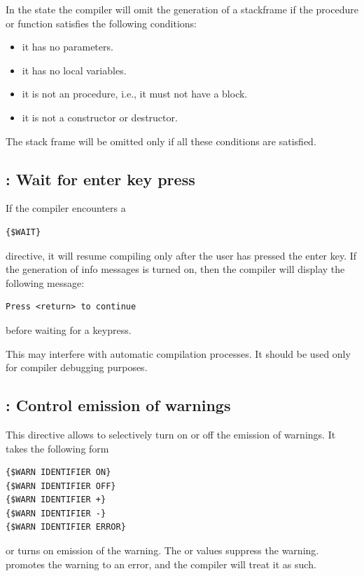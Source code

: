 In the  state the compiler will omit the generation of a
stackframe if the procedure or function satisfies the following conditions:

\begin{itemize}
\item it has no parameters.
\item it has no local variables.
\item it is not an  procedure, i.e., it must not have
a  block.
\item it is not a constructor or destructor.
\end{itemize}
The stack frame will be omitted only if all these conditions are satisfied.

\subsection{ : Wait for enter key press}

If the compiler encounters a
\begin{verbatim}
{$WAIT}
\end{verbatim}
directive, it will resume compiling only after the user has pressed the
enter key. If the generation of info messages is turned on, then the compiler
will display the following message:
\begin{verbatim}
Press <return> to continue
\end{verbatim}
before waiting for a keypress.
\begin{remark}
This may interfere with automatic compilation processes. 
It should be used only for compiler debugging purposes.
\end{remark}

\subsection{ : Control emission of warnings}
This directive allows to selectively turn on or off the emission of
warnings. It takes the following form
\begin{verbatim}
{$WARN IDENTIFIER ON}
{$WARN IDENTIFIER OFF}
{$WARN IDENTIFIER +}
{$WARN IDENTIFIER -}
{$WARN IDENTIFIER ERROR}
\end{verbatim}
 or \var{+} turns on emission of the warning. The  or
\var{-} values suppress the warning.  promotes the warning to an
error, and the compiler will treat it as such.

